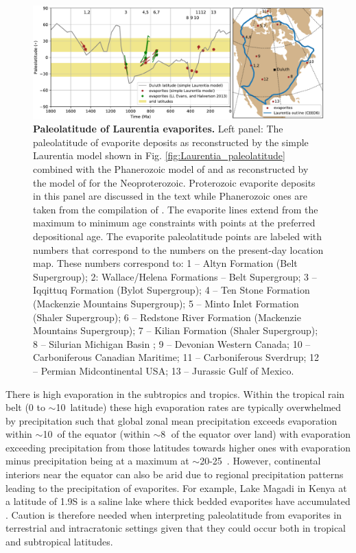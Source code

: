 \documentclass[twocolumn, switch]{article} %
\begin{document}
\begin{figure}
\centering
\includegraphics[width=7 in]{../Figures/Laurentia_evaporite_figure.pdf}
\caption{\textbf{Paleolatitude of Laurentia evaporites.} Left panel: The paleolatitude of evaporite deposits as reconstructed by the simple Laurentia model shown in Fig. \ref{fig:Laurentia_paleolatitude} combined with the Phanerozoic model of \cite{Torsvik2017a} and as reconstructed by the model of \cite{Li2013a} for the Neoproterozoic. Proterozoic evaporite deposits in this panel are discussed in the text while Phanerozoic ones are taken from the compilation of \cite{Evans2006a}. The evaporite lines extend from the maximum to minimum age constraints with points at the preferred depositional age. The evaporite paleolatitude points are labeled with numbers that correspond to the numbers on the present-day location map. These numbers correspond to: 1 -- Altyn Formation (Belt Supergroup); 2: Wallace/Helena Formations -- Belt Supergroup; 3 -- Iqqittuq Formation (Bylot Supergroup); 4 -- Ten Stone Formation (Mackenzie Mountains Supergroup); 5 -- Minto Inlet Formation (Shaler Supergroup); 6 -- Redstone River Formation (Mackenzie Mountains Supergroup); 7 -- Kilian Formation (Shaler Supergroup); 8 -- Silurian Michigan Basin ; 9 -- Devonian Western Canada; 10 -- Carboniferous Canadian Maritime; 11 -- Carboniferous Sverdrup; 12 -- Permian Midcontinental USA; 13 -- Jurassic Gulf of Mexico.}
\label{fig:Laurentia_evaporites}
\end{figure}

There is high evaporation in the subtropics and tropics. Within the tropical rain belt (0 to $\sim$10\textdegree\ latitude) these high evaporation rates are typically overwhelmed by precipitation such that global zonal mean precipitation exceeds evaporation within $\sim$10\textdegree\ of the equator (within $\sim$8\textdegree$\;$ of the equator over land) with evaporation exceeding precipitation from those latitudes towards higher ones with evaporation minus precipitation being at a maximum at $\sim$20-25\textdegree\ \citep{Park2020b}. However, continental interiors near the equator can also be arid due to regional precipitation patterns leading to the precipitation of evaporites. For example, Lake Magadi in Kenya at a latitude of 1.9\textdegree S is a saline lake where thick bedded evaporites have accumulated \citep{Eugster1980a}. Caution is therefore needed when interpreting paleolatitude from evaporites in terrestrial and intracratonic settings given that they could occur both in tropical and subtropical latitudes.
\end{document}
